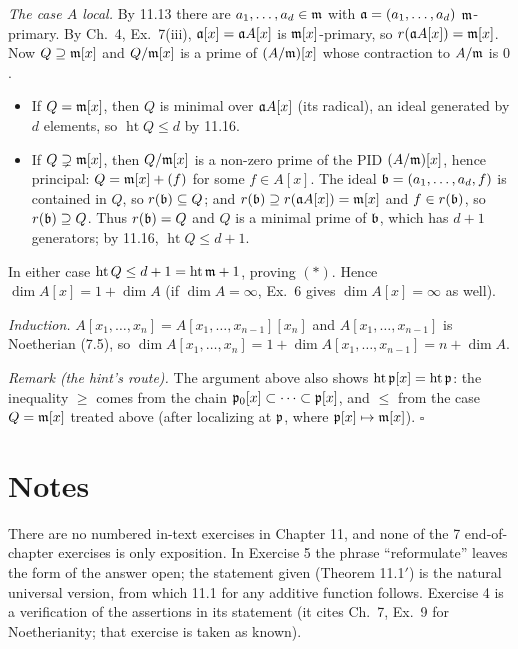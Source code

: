 \documentclass[11pt]{article}
\begin{document}
\emph{The case $A$ local.} By 11.13 there are $a_1,\dots,a_d\in\mathfrak m$ with $\mathfrak a=(a_1,\dots,a_d)$ $\mathfrak m$-primary. By Ch.~4, Ex.~7(iii), $\mathfrak a[x]=\mathfrak a A[x]$ is $\mathfrak m[x]$-primary, so $r(\mathfrak a A[x])=\mathfrak m[x]$. Now $Q\supseteq\mathfrak m[x]$ and $Q/\mathfrak m[x]$ is a prime of $(A/\mathfrak m)[x]$ whose contraction to $A/\mathfrak m$ is $0$.
\begin{itemize}[leftmargin=*]
\item If $Q=\mathfrak m[x]$, then $Q$ is minimal over $\mathfrak a A[x]$ (its radical), an ideal generated by $d$ elements, so $\operatorname{ht}Q\le d$ by 11.16.
\item If $Q\supsetneq\mathfrak m[x]$, then $Q/\mathfrak m[x]$ is a non-zero prime of the PID $(A/\mathfrak m)[x]$, hence principal: $Q=\mathfrak m[x]+(f)$ for some $f\in A[x]$. The ideal $\mathfrak b=(a_1,\dots,a_d,f)$ is contained in $Q$, so $r(\mathfrak b)\subseteq Q$; and $r(\mathfrak b)\supseteq r(\mathfrak a A[x])=\mathfrak m[x]$ and $f\in r(\mathfrak b)$, so $r(\mathfrak b)\supseteq Q$. Thus $r(\mathfrak b)=Q$ and $Q$ is a minimal prime of $\mathfrak b$, which has $d+1$ generators; by 11.16, $\operatorname{ht}Q\le d+1$.
\end{itemize}
In either case $\operatorname{ht}Q\le d+1=\operatorname{ht}\mathfrak m+1$, proving $(\ast)$. Hence $\dim A[x]=1+\dim A$ (if $\dim A=\infty$, Ex.~6 gives $\dim A[x]=\infty$ as well).

\emph{Induction.} $A[x_1,\dots,x_n]=A[x_1,\dots,x_{n-1}][x_n]$ and $A[x_1,\dots,x_{n-1}]$ is Noetherian (7.5), so $\dim A[x_1,\dots,x_n]=1+\dim A[x_1,\dots,x_{n-1}]=n+\dim A$.

\emph{Remark (the hint's route).} The argument above also shows $\operatorname{ht}\mathfrak p[x]=\operatorname{ht}\mathfrak p$: the inequality $\ge$ comes from the chain $\mathfrak p_0[x]\subset\cdots\subset\mathfrak p[x]$, and $\le$ from the case $Q=\mathfrak m[x]$ treated above (after localizing at $\mathfrak p$, where $\mathfrak p[x]\mapsto\mathfrak m[x]$). \hfill$\square$

\section*{Notes}
There are no numbered in-text exercises in Chapter 11, and none of the 7 end-of-chapter exercises is only exposition. In Exercise 5 the phrase ``reformulate'' leaves the form of the answer open; the statement given (Theorem 11.1$'$) is the natural universal version, from which 11.1 for any additive function follows. Exercise 4 is a verification of the assertions in its statement (it cites Ch.~7, Ex.~9 for Noetherianity; that exercise is taken as known).
\end{document}
